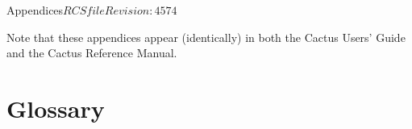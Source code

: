 
\begin{cactuspart}{Appendices}{$RCSfile$}{$Revision: 4574 $}
\label{part:Appendices}
\renewcommand{\thepage}{\Alph{part}\arabic{page}}

Note that these appendices appear (identically) in both the
Cactus Users' Guide and the Cactus Reference Manual.


\chapter{Glossary}
\label{sec:glossary}

\begin{Lentry}


\end{Lentry}
\end{cactuspart}
